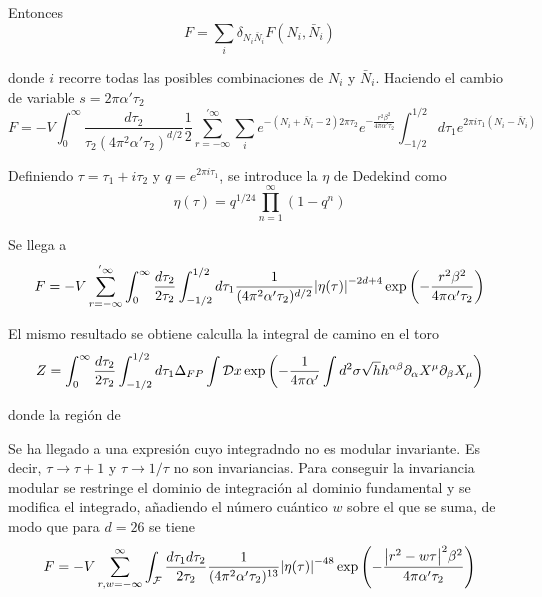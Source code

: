 Entonces
\begin{equation}
  F=\sum_i \delta_{N_i \bar N_i} F(N_i,\bar N_i)
\end{equation}

donde $i$ recorre todas las posibles combinaciones de $N_i$ y $\bar N_i$.
Haciendo el cambio de variable $s=2\pi\alpha'\tau_2$
\begin{equation}
  F=-V \int_0^\infty \frac{d\tau_2}{\tau_2(4\pi^2\alpha'\tau_2)^{d/2}}\frac 1 2\sum_{r=-\infty}^{'\infty} 
  \sum_i e^{-(N_i+\bar N_i -2)2\pi\tau_2} e^{-\frac{r^2\beta^2}{4\pi\alpha'\tau_2}}\int_{-1/2}^{1/2} d\tau_1 e^{2\pi i\tau_1(N_i-\bar N_i)}
\end{equation}

Definiendo $\tau=\tau_1+i\tau_2$ y $q=e^{2\pi i\tau_1}$, se introduce la $\eta$ de 
Dedekind como
\begin{equation}
  \eta(\tau)=q^{1/24}\prod_{n=1}^{\infty} (1-q^n)
\end{equation}

Se llega a
\begin{equation}
  F=-V \sum_{r=-\infty}^{'\infty} \int_0^\infty\frac{d\tau_2}{2\tau_2} \int_{-1/2}^{1/2} d\tau_1  \frac{1}{(4\pi^2\alpha'\tau_2)^{d/2}}
  \abs{\eta(\tau)}^{-2d+4}\exp\qty(-\frac{r^2\beta^2}{4\pi\alpha'\tau_2})
\end{equation}

El mismo resultado se obtiene calculla la integral de camino en el toro
\begin{equation}
  Z= \int_0^\infty\frac{d\tau_2}{2\tau_2} \int_{-1/2}^{1/2} d\tau_1 \Delta_{FP} \int \mathcal Dx
  \exp\qty(-\frac{1}{4\pi\alpha'}\int d^2\sigma \sqrt h h^{\alpha\beta}\partial_\alpha X^\mu \partial_\beta X_\mu)
\end{equation}

donde la región de 

Se ha llegado a una expresión cuyo integradndo no es modular invariante. Es decir, 
$\tau\to\tau+1$ y $\tau\to1/\tau$ no son invariancias.
Para conseguir la invariancia modular se restringe el dominio de integración al dominio
fundamental y se modifica el integrado, añadiendo el número cuántico $w$ sobre el que 
se suma, de modo que para $d=26$ se tiene
\begin{equation}
  F=-V \sum_{r,w=-\infty}^{\infty} \int_\mathcal{F}  \frac{d\tau_1d\tau_2}{2\tau_2}   \frac{1}{(4\pi^2\alpha'\tau_2)^{13}}
  \abs{\eta(\tau)}^{-48}\exp\qty(-\frac{\abs{r^2-w\tau}^2\beta^2}{4\pi\alpha'\tau_2})
\end{equation}

